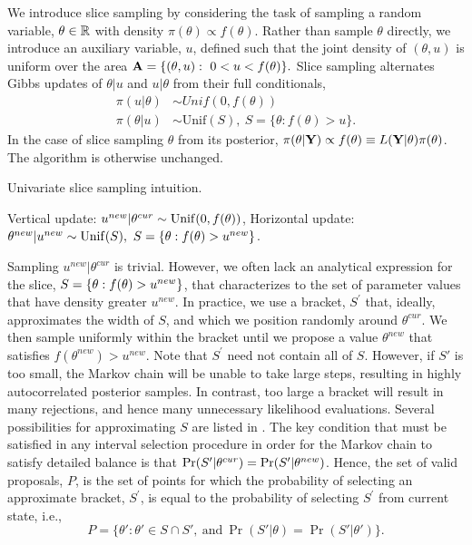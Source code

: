 We introduce slice sampling by considering the task of sampling a random variable, $ \theta\in\mathbb{R} $ with density $ \pi(\theta)\propto f(\theta) $.  Rather than sample $ \theta $ directly, we introduce an auxiliary variable, $ u $, defined such that the joint density of $ (\theta,u) $ is uniform over the area $ \mathbf{A} = \lbrace (\theta,u):\ 0<u<f(\theta) \rbrace. $ Slice sampling alternates Gibbs updates of $ \theta|u $ and $ u|\theta $ from their full conditionals,
\begin{align*}
\pi(u|\theta) &\sim Unif(0,f(\theta)) \\
\pi(\theta|u) &\sim \mathrm{Unif}(S),\ S = \lbrace \theta: f(\theta) > u\rbrace.
\end{align*}
In the case of slice sampling $ \theta $ from its posterior, $ \pi(\theta|\mathbf{Y})\propto f(\theta) \equiv L(\mathbf{Y}|\theta)\pi(\theta) $. The algorithm is otherwise unchanged. 

\begin{algorithm}[htbp]
	\caption{Univariate slice sampling intuition.}\label{alg:univar_slice_intuition}
	\begin{algorithmic}[1]
		\State Vertical update: $ u^{new}|\theta^{cur} \sim \mathrm{Unif}(0,f(\theta))$,
		\State Horizontal update: $ \theta^{new}|u^{new} \sim \mathrm{Unif}(S),\ S = \lbrace \theta: f(\theta) > u^{new}\rbrace$.
		\EndProcedure
	\end{algorithmic}
\end{algorithm}
Sampling $ u^{new}|\theta^{cur} $ is trivial. However, we often lack an analytical expression for the slice, $ S = \lbrace \theta: f(\theta) > u^{new}\rbrace$, that characterizes to the set of parameter values that have density greater $ u^{new} $. In practice, we use a bracket, $ S^\prime $ that, ideally, approximates the width of $ S $, and which we position randomly around $ \theta^{cur} $. We then sample uniformly within the bracket until we propose a value $ \theta^{new} $ that satisfies $ f(\theta^{new})>u^{new} $. Note that $ S^\prime $ need not contain all of $ S $. However, if $ S' $ is too small, the Markov chain will be unable to take large steps, resulting in highly autocorrelated posterior samples. In contrast, too large a bracket will result in many rejections, and hence many unnecessary likelihood evaluations. Several possibilities for approximating $ S $ are listed in \cite{neal2003slice}. The key condition that must be satisfied in any interval selection procedure in order for the Markov chain to satisfy detailed balance is that $ \Pr(S'|\theta^{cur}) = \Pr(S'|\theta^{new}) $. Hence, the set of valid proposals, $ P $, is the set of points for which the probability of selecting an approximate bracket, $ S^\prime $, is equal to the probability of selecting $ S^\prime $ from current state, i.e., \[ P = \lbrace \theta': \theta' \in S\cap S',\ \mathrm{and}\ \Pr(S'|\theta) = \Pr(S'|\theta')\rbrace. \]

